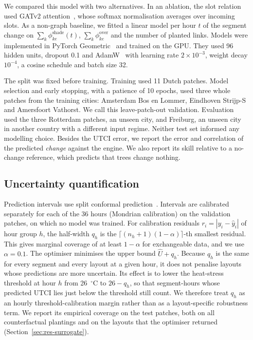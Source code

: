 \documentclass[preprint,12pt,authoryear]{elsarticle}
\newcommand{\degC}{\ensuremath{^\circ}C}
\begin{document}
We compared this model with two alternatives. In an ablation, the slot relation used GATv2 attention~\citep{brody2022}, whose softmax normalisation averages over incoming slots. As a non-graph baseline, we fitted a linear model per hour $t$ of the segment change on $\sum_k \phi^\mathrm{shade}_{ke}(t)$, $\sum_k \phi^\mathrm{over}_{ke}$ and the number of planted links. Models were implemented in PyTorch Geometric~\citep{fey2019} and trained on the GPU. They used 96 hidden units, dropout 0.1 and AdamW~\citep{loshchilov2019} with learning rate $2\times10^{-3}$, weight decay $10^{-4}$, a cosine schedule and batch size 32.

The split was fixed before training. Training used 11 Dutch patches. Model selection and early stopping, with a patience of 10 epochs, used three whole patches from the training cities: Amsterdam Bos en Lommer, Eindhoven Strijp-S and Amersfoort Vathorst. We call this leave-patch-out validation. Evaluation used the three Rotterdam patches, an unseen city, and Freiburg, an unseen city in another country with a different input regime. Neither test set informed any modelling choice. Besides the UTCI error, we report the error and correlation of the predicted \emph{change} against the engine. We also report its skill relative to a no-change reference, which predicts that trees change nothing.

\subsection{Uncertainty quantification}\label{sec:conformal}

Prediction intervals use split conformal prediction~\citep{lei2018,angelopoulos2021}. Intervals are calibrated separately for each of the 36 hours (Mondrian calibration) on the validation patches, on which no model was trained. For calibration residuals $r_i = |y_i - \hat y_i|$ of hour group $h$, the half-width $q_h$ is the $\lceil (n_h+1)(1-\alpha)\rceil$-th smallest residual. This gives marginal coverage of at least $1-\alpha$ for exchangeable data, and we use $\alpha = 0.1$. The optimiser minimises the upper bound $\hat U + q_h$. Because $q_h$ is the same for every segment and every layout at a given hour, it does not penalise layouts whose predictions are more uncertain. Its effect is to lower the heat-stress threshold at hour $h$ from 26~\degC{} to $26 - q_h$, so that segment-hours whose predicted UTCI lies just below the threshold still count. We therefore treat $q_h$ as an hourly threshold-calibration margin rather than as a layout-specific robustness term. We report its empirical coverage on the test patches, both on all counterfactual plantings and on the layouts that the optimiser returned (Section~\ref{sec:res-surrogate}).
\end{document}
